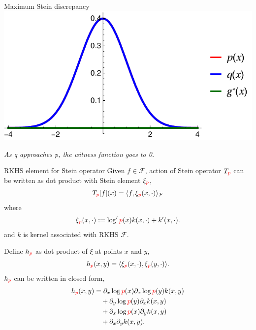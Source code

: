 \begin{frame}
\begin{columns}
\begin{column}{.33\linewidth}
\begin{block}{Maximum Stein discrepancy}
\includegraphics[scale=1.2]{../../presentation/img/s0.pdf}
\vspace{1cm}
\begin{center}
\emph{As { \color{blue} q} approaches {\color{red} p}, the {\color{mg} witness function} goes to 0. }
\end{center}
\end{block} %


\vspace{-0.75cm}
\begin{block}{RKHS element for Stein operator}
Given $f\in \mathcal{F}$, action of Stein operator $T_{\color{red} p}$ can be written as dot product with Stein element $\xi_{{ \color{red} p}}$,
 \begin{equation*}
T_{\color{red} p}[f](x) = \langle f, \xi_{{ \color{red} p}}(x,\cdot) \rangle_{\mathcal{F}}
\end{equation*}
where
 \begin{equation*}
\xi_{{ \color{red} p}}(x,\cdot):=\log' { \color{red} p}(x) k(x,\cdot)+  k'(x,\cdot).
\end{equation*}
and $k$ is kernel associated with RKHS $\mathcal{F}$.

Define $h_{{ \color{red} p}}$ as dot product of  $\xi$ at points $x$ and $y$, 
\[
h_{{\color{red} p}}(x,y)   = \langle\xi_{{ \color{red} p}}(x,\cdot),\xi_{{ \color{red} p}}(y,\cdot)\rangle. 
\]
$h_{{ \color{red} p}}$ can be written in closed form,
\begin{align*}
h_{{\color{red} p}}(x,y) & = \partial_{x} \log {\color{red} p}(x) \partial_{x} \log {\color{red} p}(y) k(x,y)\\
 & \quad+\partial_{y} \log {\color{red} p}(y) \partial_{x}  k(x,y)\\
 & \quad+\partial_{x} \log {\color{red} p}(x) \partial_{y}k(x,y)\\
 & \quad+\partial_{x} \partial_{y} k(x,y).
\end{align*}


\end{block}
\end{column}
\end{columns}
\end{frame}
